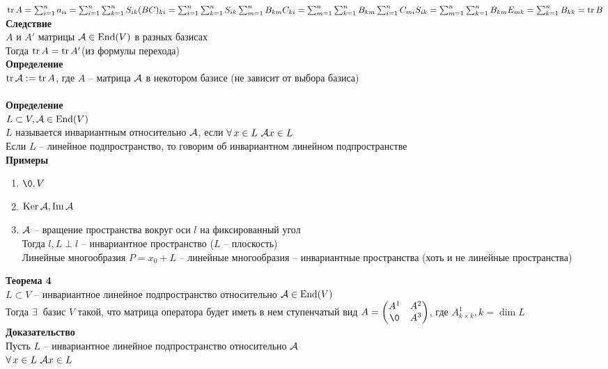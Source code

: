 \documentclass[12pt]{article}
\begin{document}
$\operatorname{tr} A = \sum_{i=1}^na_{ii}=\sum_{i=1}^n\sum_{k=1}^n S_{ik}(BC)_{ki} = \sum_{i=1}^n\sum_{k=1}^n S_{ik}\sum_{m=1}^nB_{km}C_{ki} = \sum_{m=1}^n\sum_{k=1}^n B_{km}\sum_{i=1}^nC_{mi}S_{ik} = \sum_{m=1}^n\sum_{k=1}^n B_{km} E_{mk} = \sum_{k=1}^n B_{kk} = \operatorname{tr} B$\\
\textbf{Следствие}\\
$A$ и $A'$ матрицы $\mathcal{A} \in \operatorname{End}(V)$ в разных базисах\\
Тогда $\operatorname{tr} A = \operatorname{tr} A'$(из формулы перехода)\\
\textbf{Определение}\\
$\operatorname{tr} \mathcal{A}:=\operatorname{tr} A$, где $A$ -- матрица $\mathcal{A}$ в некотором базисе (не зависит от выбора базиса)\\\\
\textbf{Определение}\\
$L \subset V, \mathcal{A} \in \operatorname{End}(V)$\\
$L$ называется инвариантным относительно $\mathcal{A}$, если $\forall\, x\in L\ \mathcal{A} x \in L$\\
Если $L$ -- линейное подпространство, то говорим об инвариантном линейном подпространстве\\
\textbf{Примеры}
\begin{enumerate}
    \item $\0, V$
    \item $\operatorname{Ker} \mathcal{A}, \operatorname{Im} \mathcal{A}$
    \item $\mathcal{A}$ -- вращение пространства вокруг оси $l$ на фиксированный угол\\
    Тогда $l, L \perp l$ -- инвариантное пространство ($L$ -- плоскость)\\
    Линейные многообразия $P = x_0 + L$ -- линейные многообразия -- инвариантные пространства (хоть и не линейные пространства)
\end{enumerate}
\textbf{Теорема 4}\\
$L \subset V$ -- инвариантное линейное подпространство относительно $\mathcal{A} \in \operatorname{End}(V)$\\
Тогда $\exists\,$ базис $V$ такой, что матрица оператора будет иметь в нем ступенчатый вид $A = \begin{pmatrix}
    A^1 & A^2\\
    \0 & A^3
\end{pmatrix}$, где $A^1_{k\times k}, k = \dim L$\\
\textbf{Доказательство}\\
Пусть $L$ -- инвариантное линейное подпространство относительно $\mathcal{A}$\\
$\forall\, x\in L\ \mathcal{A} x \in L$\\
\end{document}
